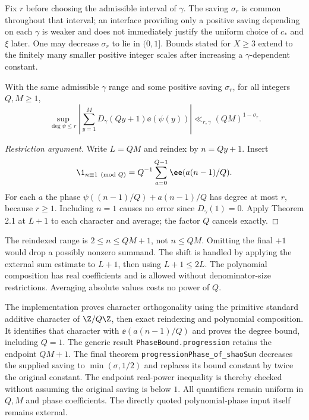 Fix $r$ before choosing the admissible interval of $\gamma$. The saving $\sigma_r$ is common throughout that interval; an interface providing only a positive saving depending on each $\gamma$ is weaker and does not immediately justify the uniform choice of $c_*$ and $\xi$ later. One may decrease $\sigma_r$ to lie in $(0,1]$. Bounds stated for $X\geq3$ extend to the finitely many smaller positive integer scales after increasing a $\gamma$-dependent constant.
\fi

\begin{lemma}\label{l:progression-phase}
\leanok
With the same admissible $\gamma$ range and some positive saving $\sigma_r$, for all integers $Q,M\geq1$,
\[
 \sup_{\deg\psi\leq r}
 \left|\sum_{y=1}^{M}D_\gamma(Qy+1)\ee(\psi(y))\right|
 \ll_{r,\gamma}(QM)^{1-\sigma_r}.
\]
\end{lemma}
\begin{proof}[Restriction argument]
\leanok
Write $L=QM$ and reindex by $n=Qy+1$. Insert
\[
 \1_{n\equiv1\pmod Q}=Q^{-1}\sum_{a=0}^{Q-1}\ee(a(n-1)/Q).
\]
For each $a$ the phase $\psi((n-1)/Q)+a(n-1)/Q$ has degree at most $r$, because $r\geq1$. Including $n=1$ causes no error since $D_\gamma(1)=0$. Apply Theorem 2.1 at $L+1$ to each character and average; the factor $Q$ cancels exactly.
\end{proof}
\ifDetailed
The reindexed range is $2\leq n\leq QM+1$, not $n\leq QM$. Omitting the final $+1$ would drop a possibly nonzero summand. The shift is handled by applying the external sum estimate to $L+1$, then using $L+1\leq2L$. The polynomial composition has real coefficients and is allowed without denominator-size restrictions. Averaging absolute values costs no power of $Q$.

The implementation proves character orthogonality using the primitive standard additive character of $\Z/Q\Z$, then exact reindexing and polynomial composition. It identifies that character with $\ee(a(n-1)/Q)$ and proves the degree bound, including $Q=1$. The generic result \texttt{PhaseBound.progression} retains the endpoint $QM+1$. The final theorem \texttt{progressionPhase\_\allowbreak{}of\_\allowbreak{}shaoSun} decreases the supplied saving to $\min(\sigma,1/2)$ and replaces its bound constant by twice the original constant. The endpoint real-power inequality is thereby checked without assuming the original saving is below $1$. All quantifiers remain uniform in $Q,M$ and phase coefficients. The directly quoted polynomial-phase input itself remains external.
\fi

